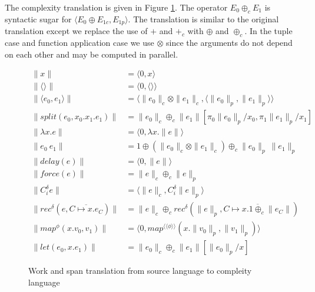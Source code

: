 %
The complexity translation is given in Figure
\ref{fig:ws_complexity_translation}.  The operator $E_0 \oplus_c E_1$ is
syntactic sugar for $\langle E_0 \oplus E_{1c}, E_{1p} \rangle$.  The
translation is similar to the original translation except we replace the use of
$+$ and $+_c$ with $\oplus$ and $\oplus_c$.  In the tuple case and function
application case we use $\otimes$ since the arguments do not depend on each
other and may be computed in parallel.
%
\begin{figure}
  \label{fig:ws_complexity_translation}
  \caption{Work and span translation from source language to compleity language}
  \begin{align*}
    \|x\| &= \langle 0, x \rangle \\
    \|\langle\rangle\| &= \langle 0, \langle \rangle \rangle \\
    \|\langle e_0, e_1 \rangle \| &= \langle \|e_0\|_c \otimes \|e_1\|_c, \langle \|e_0\|_p, \|e_1\|_p\rangle\rangle \\
    \|split(e_0, x_0.x_1.e_1)\| &= \|e_0\|_c \oplus_c \|e_1\|[\pi_0\|e_0\|_p/x_0, \pi_1\|e_1\|_p/x_1] \\
    \|\lambda x.e\| &= \langle 0, \lambda x.\|e\| \rangle \\
    \|e_0\ e_1\| &= 1 \oplus (\|e_0\|_c \otimes \|e_1\|_c) \oplus_c \|e_0\|_p\ \|e_1\|_p \\
    \|delay(e)\| &= \langle 0, \|e\|\rangle \\
    \|force(e)\| &= \|e\|_c \oplus_c \|e\|_p \\
    \|C_i^\delta e\| &= \langle \|e\|_c, C_i^\delta \|e\|_p \rangle \\
    \|rec^\delta(e, \overline{C \mapsto x.e_C})\| &= \|e\|_c \oplus_c rec^\delta(\|e\|_p, \overline{C \mapsto x.1 \oplus_c \|e_C\|}) \\
    \|map^\phi(x.v_0, v_1)\| &= \langle 0, map^{\langle\langle \phi \rangle \rangle} (x. \|v_0\|_p, \|v_1\|_p)\rangle \\
    \|let(e_0, x.e_1)\| &= \|e_0\|_c \oplus_c \|e_1\|[\|e_0\|_p/x]
  \end{align*}
\end{figure}
%
